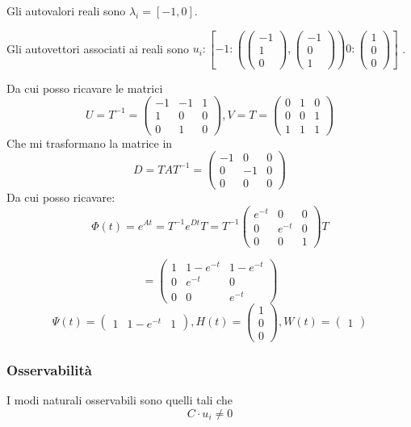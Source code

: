 \documentclass{article}
\begin{document}
Gli autovalori reali sono $\lambda_i = [-1, 0]$.

Gli autovettori associati ai reali sono $ u_i: [  -1: (\left(\begin{matrix}-1\\1\\0\end{matrix}\right), \left(\begin{matrix}-1\\0\\1\end{matrix}\right))0: \left(\begin{matrix}1\\0\\0\end{matrix}\right) ]$
.

Da cui posso ricavare le matrici \[U=T^{-1} = \left(\begin{matrix}-1 & -1 & 1\\1 & 0 & 0\\0 & 1 & 0\end{matrix}\right), V = T = \left(\begin{matrix}0 & 1 & 0\\0 & 0 & 1\\1 & 1 & 1\end{matrix}\right)\]
Che mi trasformano la matrice in \[ D = TAT^{-1} = \left(\begin{matrix}-1 & 0 & 0\\0 & -1 & 0\\0 & 0 & 0\end{matrix}\right) \]
Da cui posso ricavare: \[ \Phi(t) = e^{At} = T^{-1} e^{Dt} T =  T^{-1} \left(\begin{matrix}e^{- t} & 0 & 0\\0 & e^{- t} & 0\\0 & 0 & 1\end{matrix}\right) T\]

\[ = \left(\begin{matrix}1 & 1 - e^{- t} & 1 - e^{- t}\\0 & e^{- t} & 0\\0 & 0 & e^{- t}\end{matrix}\right) \]\[ \Psi(t) = \left(\begin{matrix}1 & 1 - e^{- t} & 1\end{matrix}\right), H(t) =  \left(\begin{matrix}1\\0\\0\end{matrix}\right),W(t) = \left(\begin{matrix}1\end{matrix}\right)\]\subsubsection{Osservabilità}
 I modi naturali osservabili sono quelli tali che 
\[ C \cdot u_i   \neq 0\]
\end{document}
